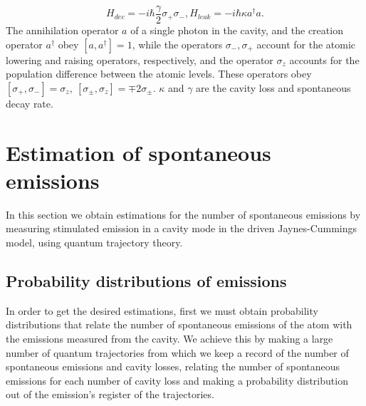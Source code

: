 \documentclass[conference]{IEEEtran}
\begin{document}
\begin{subequations}
\begin{equation}
H_{dec} = - i\hbar\frac{\gamma}{2}\sigma_+\sigma_-,
\end{equation}
\begin{equation}
H_{leak} = - i\hbar\kappa a^\dagger a.
\end{equation}
\end{subequations}
The annihilation operator $a$ of a single photon in the cavity, and the creation operator $a^\dagger$ obey $[a, a^\dagger] = 1$, while the operators $\sigma_-, \sigma_+$  account for the atomic lowering and raising operators, respectively, and the operator $\sigma_z$ accounts for the population difference between the atomic levels. These operators obey $[\sigma_+, \sigma_-] = \sigma_z, \ [\sigma_\pm, \sigma_z] = \mp 2\sigma_\pm$. $\kappa$ and $\gamma$ are the cavity loss and spontaneous decay rate.\\ %
\section{Estimation of spontaneous emissions}
In this section we obtain estimations for the number of spontaneous emissions by measuring stimulated emission in a cavity mode in the driven Jaynes-Cummings model, using quantum trajectory theory.
\subsection{Probability distributions of emissions}
In order to get the desired estimations, first we must obtain probability distributions that relate the number of spontaneous emissions of the atom with the emissions measured from the cavity. We achieve this by making a large number of quantum  trajectories from which we keep a record of the number of spontaneous emissions and cavity losses, relating the number of spontaneous emissions for each number of cavity loss and making a probability distribution out of the emission's register of the trajectories. \\
\end{document}
